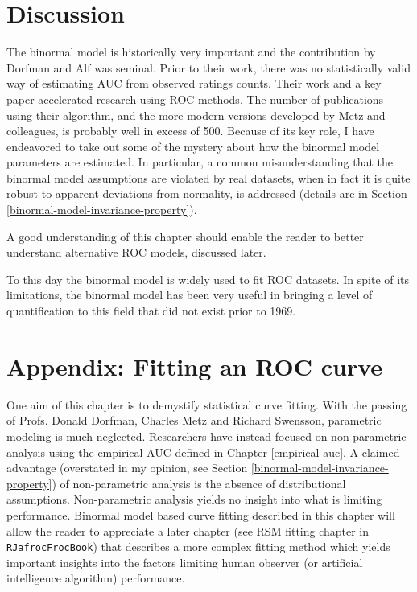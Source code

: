 \documentclass[
]{book}
\begin{document}
\hypertarget{binormal-model-discussion}{%
\section{Discussion}\label{binormal-model-discussion}}

The binormal model is historically very important and the contribution by Dorfman and Alf \citep{dorfman1969maximum} was seminal. Prior to their work, there was no statistically valid way of estimating AUC from observed ratings counts. Their work and a key paper \citep{RN1487} accelerated research using ROC methods. The number of publications using their algorithm, and the more modern versions developed by Metz and colleagues, is probably well in excess of 500. Because of its key role, I have endeavored to take out some of the mystery about how the binormal model parameters are estimated. In particular, a common misunderstanding that the binormal model assumptions are violated by real datasets, when in fact it is quite robust to apparent deviations from normality, is addressed (details are in Section \ref{binormal-model-invariance-property}).

A good understanding of this chapter should enable the reader to better understand alternative ROC models, discussed later.

To this day the binormal model is widely used to fit ROC datasets. In spite of its limitations, the binormal model has been very useful in bringing a level of quantification to this field that did not exist prior to 1969.

\hypertarget{binormal-model-curve-fitting-appendix}{%
\section{Appendix: Fitting an ROC curve}\label{binormal-model-curve-fitting-appendix}}

One aim of this chapter is to demystify statistical curve fitting. With the passing of Profs. Donald Dorfman, Charles Metz and Richard Swensson, parametric modeling is much neglected. Researchers have instead focused on non-parametric analysis using the empirical AUC defined in Chapter \ref{empirical-auc}. A claimed advantage (overstated in my opinion, see Section \ref{binormal-model-invariance-property}) of non-parametric analysis is the absence of distributional assumptions. Non-parametric analysis yields no insight into what is limiting performance. Binormal model based curve fitting described in this chapter will allow the reader to appreciate a later chapter (see RSM fitting chapter in \texttt{RJafrocFrocBook}) that describes a more complex fitting method which yields important insights into the factors limiting human observer (or artificial intelligence algorithm) performance.
\end{document}
